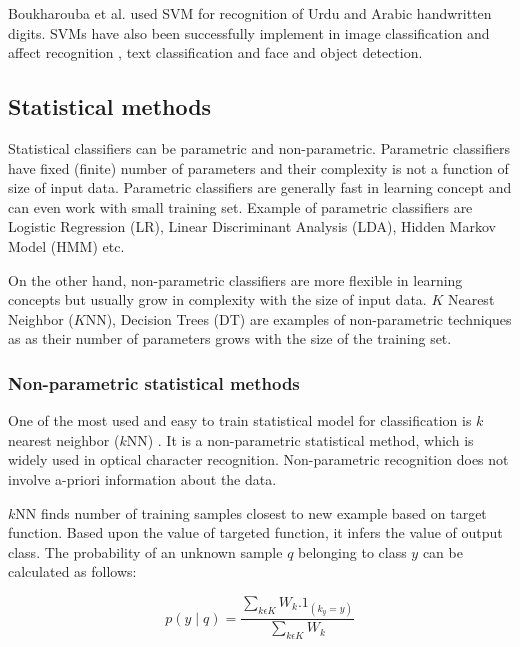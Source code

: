 \documentclass{article}
\begin{document}
Boukharouba et al. \cite{boukharouba2017novel,yang2005discrimination} used SVM for recognition of Urdu and Arabic handwritten digits. SVMs have also been successfully implement in image classification and affect recognition \cite{yang2009linear, KHAN20131159}, text classification \cite{haddoud2016combining} and face and object detection\cite{ning2016object,tao2016robust}. 








\subsection{Statistical methods}
Statistical classifiers can be parametric and non-parametric. Parametric classifiers have fixed (finite) number of parameters and their complexity is not a function of size of input data. Parametric classifiers are generally fast in learning concept and can even work with small training set. Example of parametric classifiers are Logistic Regression (LR), Linear Discriminant Analysis (LDA), Hidden Markov Model (HMM) etc.


On the other hand, non-parametric classifiers are more flexible in learning concepts but usually grow in complexity with the size of input data.  $K$ Nearest Neighbor ($K$NN), Decision Trees (DT) are examples of non-parametric techniques as as their number of parameters grows with the size of the training set.




\subsubsection{Non-parametric statistical methods}
One of the most used and easy to train statistical model for classification is $k$ nearest neighbor ($k$NN) \cite{liu2003handwritten,akbari2018novel,chandio2018character}. It is a non-parametric statistical method, which is widely used in optical character recognition. Non-parametric recognition does not involve a-priori information about the data.

$k$NN finds number of training samples closest to new example based on target function. Based upon the value of targeted function, it infers the value of output class. The probability of an unknown sample $q$ belonging to class $y$ can be calculated as follows: 



\begin{equation}\label{KNN}
p (y\mid q) = \frac {\sum_ {k \epsilon K} W_{k} .1_{(k_{y}=y)}}{\sum_ {k \epsilon K} W_{k}}
\end{equation}
\end{document}
